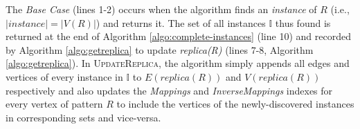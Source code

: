 The \textit{Base Case} (lines 1-2) occurs when the algorithm finds an
\textit{instance} of $R$ (i.e., $|instance|=|V(R)|$) and returns it. The set of
all instances $\mathbb{I}$ thus found is returned at the end of Algorithm
\ref{algo:complete-instances} (line 10) and recorded by Algorithm
\ref{algo:getreplica} to update \textit{replica(R)} (lines 7-8, Algorithm
\ref{algo:getreplica}). In \textsc{UpdateReplica}, the algorithm simply appends
all edges and vertices of every instance in $\mathbb{I}$ to $E(replica(R))$ and
$V(replica(R))$ respectively and also updates the \textit{Mappings} and
\textit{InverseMappings} indexes for every vertex of pattern
$R$ to include the vertices of the newly-discovered instances in corresponding sets
and vice-versa.

